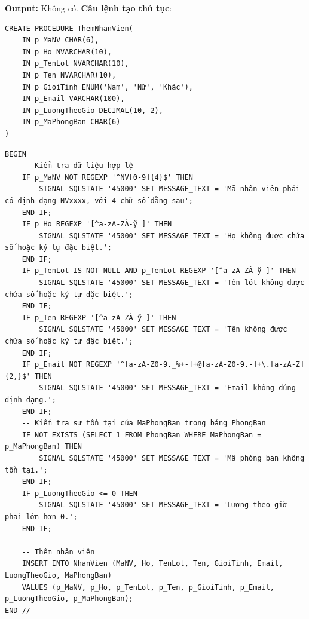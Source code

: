 \textbf{Output:} Không có.
\textbf{Câu lệnh tạo thủ tục}:
\begin{verbatim}
CREATE PROCEDURE ThemNhanVien(
    IN p_MaNV CHAR(6),
    IN p_Ho NVARCHAR(10),
    IN p_TenLot NVARCHAR(10),
    IN p_Ten NVARCHAR(10),
    IN p_GioiTinh ENUM('Nam', 'Nữ', 'Khác'),
    IN p_Email VARCHAR(100),
    IN p_LuongTheoGio DECIMAL(10, 2),
    IN p_MaPhongBan CHAR(6)
)
\end{verbatim}
\begin{verbatim}
BEGIN
    -- Kiểm tra dữ liệu hợp lệ
    IF p_MaNV NOT REGEXP '^NV[0-9]{4}$' THEN
        SIGNAL SQLSTATE '45000' SET MESSAGE_TEXT = 'Mã nhân viên phải có định dạng NVxxxx, với 4 chữ số đằng sau';
    END IF;
    IF p_Ho REGEXP '[^a-zA-ZÀ-ỹ ]' THEN
        SIGNAL SQLSTATE '45000' SET MESSAGE_TEXT = 'Họ không được chứa số hoặc ký tự đặc biệt.';
    END IF;
    IF p_TenLot IS NOT NULL AND p_TenLot REGEXP '[^a-zA-ZÀ-ỹ ]' THEN
        SIGNAL SQLSTATE '45000' SET MESSAGE_TEXT = 'Tên lót không được chứa số hoặc ký tự đặc biệt.';
    END IF;
    IF p_Ten REGEXP '[^a-zA-ZÀ-ỹ ]' THEN
        SIGNAL SQLSTATE '45000' SET MESSAGE_TEXT = 'Tên không được chứa số hoặc ký tự đặc biệt.';
    END IF;
    IF p_Email NOT REGEXP '^[a-zA-Z0-9._%+-]+@[a-zA-Z0-9.-]+\.[a-zA-Z]{2,}$' THEN
        SIGNAL SQLSTATE '45000' SET MESSAGE_TEXT = 'Email không đúng định dạng.';
    END IF;
    -- Kiểm tra sự tồn tại của MaPhongBan trong bảng PhongBan
    IF NOT EXISTS (SELECT 1 FROM PhongBan WHERE MaPhongBan = p_MaPhongBan) THEN
        SIGNAL SQLSTATE '45000' SET MESSAGE_TEXT = 'Mã phòng ban không tồn tại.';
    END IF;
    IF p_LuongTheoGio <= 0 THEN
        SIGNAL SQLSTATE '45000' SET MESSAGE_TEXT = 'Lương theo giờ phải lớn hơn 0.';
    END IF;

    -- Thêm nhân viên
    INSERT INTO NhanVien (MaNV, Ho, TenLot, Ten, GioiTinh, Email, LuongTheoGio, MaPhongBan)
    VALUES (p_MaNV, p_Ho, p_TenLot, p_Ten, p_GioiTinh, p_Email, p_LuongTheoGio, p_MaPhongBan);
END //
\end{verbatim}

